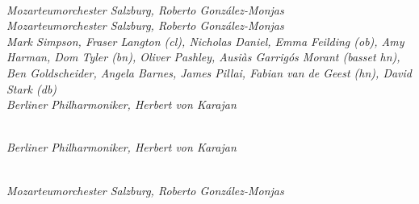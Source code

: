  \\

 \textit{Mozarteumorchester Salzburg, Roberto Gonz\'{a}lez-Monjas} \\ 
 \textit{Mozarteumorchester Salzburg, Roberto Gonz\'{a}lez-Monjas} \\ 
 \textit{Mark Simpson, Fraser Langton (cl), Nicholas Daniel, Emma Feilding (ob), Amy Harman, Dom Tyler (bn), Oliver Pashley, Ausiàs Garrigós Morant (basset hn), Ben Goldscheider, Angela Barnes, James Pillai, Fabian van de Geest (hn), David Stark (db)} \\  
 \textit{Berliner Philharmoniker, Herbert von Karajan}\marginnote{} \\

\bigskip

 \\

 \textit{Berliner Philharmoniker, Herbert von Karajan}\marginnote{} \\

\bigskip

 \\

 \textit{Mozarteumorchester Salzburg, Roberto Gonz\'{a}lez-Monjas} \\ 















